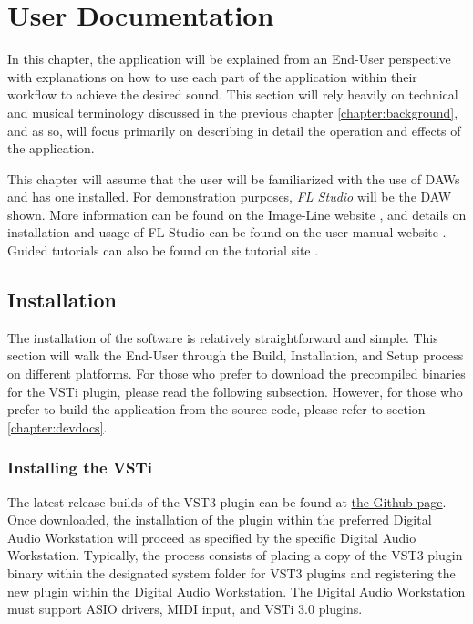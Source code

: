 \documentclass[a4paper,12pt]{report}
\begin{document}
\chapter{User Documentation}
\label{chapter:userdoc}
In this chapter, the application will be explained from an End-User perspective with explanations on how to use each part of the application within their workflow to achieve the desired sound. This section will rely heavily on technical and musical terminology discussed in the previous chapter \ref{chapter:background}, and as so, will focus primarily on describing in detail the operation and effects of the application.

This chapter will assume that the user will be familiarized with the use of DAWs and has one installed. For demonstration purposes, \emph{FL Studio} will be the DAW shown. More information can be found on the Image-Line website \cite{floverview}, and details on installation and usage of FL Studio can be found on the user manual website \cite{flmanual}. Guided tutorials can also be found on the tutorial site \cite{fltutorials}.

\section{Installation}
\label{sec:installation}
The installation of the software is relatively straightforward and simple. This section will walk the End-User through the Build, Installation, and Setup process on different platforms. For those who prefer to download the precompiled binaries for the VSTi plugin, please read the following subsection. However, for those who prefer to build the application from the source code, please refer to section \ref{chapter:devdocs}.

\subsection{Installing the VSTi}
\label{subsec:installvsti}
The latest release builds of the VST3 plugin can be found at \href{https://github.com/ParadoxChains/C3JI5D-Evan-Sitt-BSc-Thesis/tree/master/Release\%20Builds}{the Github page}\cite{github}. Once downloaded, the installation of the plugin within the preferred Digital Audio Workstation will proceed as specified by the specific Digital Audio Workstation. Typically, the process consists of placing a copy of the VST3 plugin binary within the designated system folder for VST3 plugins and registering the new plugin within the Digital Audio Workstation. The Digital Audio Workstation must support ASIO drivers, MIDI input, and VSTi 3.0 plugins.
\end{document}
